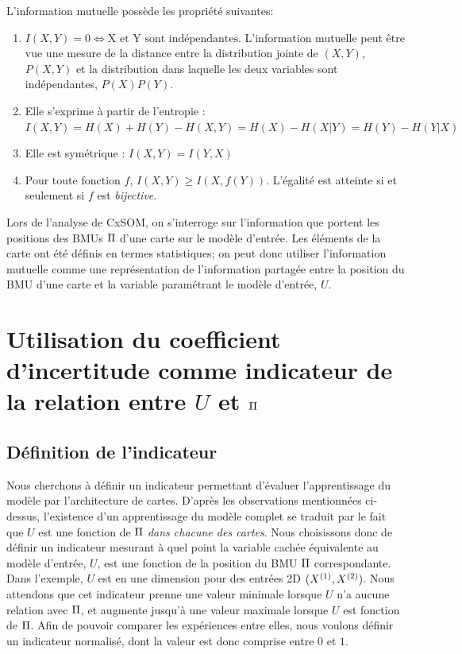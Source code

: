 L'information mutuelle possède les propriété suivantes:
\begin{enumerate}
\item $I(X,Y) = 0 \Leftrightarrow \textrm{X et Y sont indépendantes}$. L'information mutuelle peut être vue une mesure de la distance entre la distribution jointe de $(X,Y)$, $P(X,Y)$ et la distribution dans laquelle les deux variables sont indépendantes, $P(X)P(Y)$.
\item Elle s'exprime à partir de l'entropie : $I(X,Y) = H(X) + H(Y) - H(X,Y) = H(X) - H(X|Y) = H(Y) - H(Y|X)$
\item Elle est symétrique : $I(X,Y) = I(Y,X)$
\item Pour toute fonction $f$, $I(X,Y) \geq I(X,f(Y))$. L'égalité est atteinte si et seulement si $f$ est \emph{bijective}.
\end{enumerate}

Lors de l'analyse de CxSOM, on s'interroge sur l'information que portent les positions des BMUs $\Pi$ d'une carte sur le modèle d'entrée.
Les éléments de la carte ont été définis en termes statistiques; on peut donc utiliser l'information mutuelle comme une représentation de l'information partagée entre la position du BMU d'une carte et la variable paramétrant le modèle d'entrée, $U$.

\section{Utilisation du coefficient d'incertitude comme indicateur de la relation entre $U$ et $\Pi$}

\subsection{Définition de l'indicateur}

Nous cherchons à définir un indicateur permettant d'évaluer l'apprentissage du modèle par l'architecture de cartes. D'après les observations mentionnées ci-dessus, l'existence d'un apprentissage du modèle complet se traduit par le fait que $U$ est une fonction de $\Pi$ \emph{dans chacune des cartes}.
Nous choisissons donc de définir un indicateur mesurant à quel point la variable cachée équivalente au modèle d'entrée, $U$, est une fonction de la position du BMU $\Pi$ correspondante.
Dans l'exemple, $U$ est en une dimension pour des entrées 2D $(X^{({1})},X^{({2})})$.
Nous attendons que cet indicateur prenne une valeur minimale lorsque $U$ n'a aucune relation avec $\Pi$, et augmente jusqu'à une valeur maximale lorsque $U$ est fonction de $\Pi$. Afin de pouvoir comparer les expériences entre elles, nous voulons définir un indicateur normalisé, dont la valeur est donc comprise entre $0$ et $1$.

